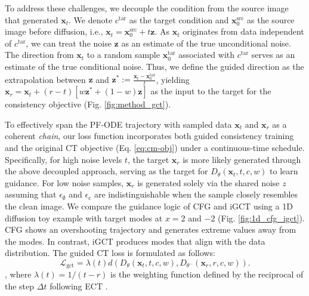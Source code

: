 To address these challenges, we decouple the condition from the source image that generated \(\boldsymbol{x}_t\). We denote \(c^\text{tar}\) as the target condition and \(\boldsymbol{x}_0^{\text{src}}\) as the source image before diffusion, i.e., \(\boldsymbol{x}_t = \boldsymbol{x}_0^{\text{src}} + t \boldsymbol{z}\). As \(\boldsymbol{x}_t\) originates from data independent of \(c^\text{tar}\), we can treat the noise \(\boldsymbol{z}\) as an estimate of the true unconditional noise. The direction from \(\boldsymbol{x}_t\) to a random sample \(\boldsymbol{x}_0^{\text{tar}}\) associated with \(c^\text{tar}\) serves as an estimate of the true conditional noise. Thus, we define the guided direction as the extrapolation between \(\boldsymbol{z}\) and \(\boldsymbol{z}^* := \frac{\boldsymbol{x}_t-\boldsymbol{x}_0^{\text{tar}}}{t}\), yielding \(\boldsymbol{x}_{r} = \boldsymbol{x}_t + (r-t) [w\boldsymbol{z}^*+(1-w)\boldsymbol{z}]\) as the input to the target for the consistency objective (Fig. \ref{fig:method_gct}).

To effectively span the PF-ODE trajectory with sampled data \(\boldsymbol{x}_t\) and \(\boldsymbol{x}_r\) as a coherent \textit{chain}, our loss function incorporates both guided consistency training and the original CT objective (Eq. \ref{eq:cm-obj}) under a continuous-time schedule. Specifically, for high noise levels \(t\), the target \(\boldsymbol{x}_r\) is more likely generated through the above decoupled approach, serving as the target for \(D_\theta(\boldsymbol{x}_t, t, c, w)\) to learn guidance. For low noise samples, \(\boldsymbol{x}_r\) is generated solely via the shared noise \(z\) assuming that \(\epsilon_\emptyset\) and \(\epsilon_{\text{c}}\) are indistinguishable when the sample closely resembles the clean image. We compare the guidance logic of CFG and iGCT using a 1D diffusion toy example with target modes at \(x=2\) and \(-2\) (Fig. \ref{fig:1d_cfg_igct}). CFG shows an overshooting trajectory and generates extreme values away from the modes. In contrast, iGCT produces modes that align with the data distribution. 
The guided CT loss is formulated as follows:
\begin{equation}
     \mathcal{L}_\text{gct} = \lambda(t) d(D_{\theta}(\boldsymbol{x}_t,t,c,w),D_{{\theta}^-}(\boldsymbol{x}_r,r,c,w)). 
    \label{eq:gct-loss}
\end{equation},
where \(\lambda(t)=1/(t-r)\) is the weighting function defined by the reciprocal of the step \(\Delta t\) following ECT \cite{ect}. 

\vspace{-0.15cm}
